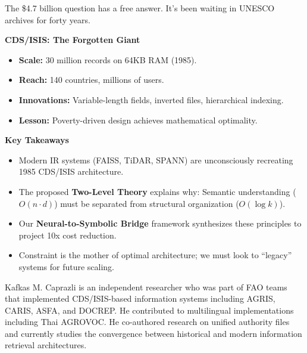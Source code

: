 \documentclass[manuscript,screen,nonacm]{acmart}
\newenvironment{sidebarbox}[1][]{%
  \def\sidebarboxtitle{#1}%
  \begin{oframed}%
  \noindent\textbf{\sidebarboxtitle}\par\smallskip
}{%
  \end{oframed}%
}
\begin{document}
The \$4.7 billion question has a free answer. It's been waiting in UNESCO archives for forty years.

\begin{sidebarbox}[CDS/ISIS: The Forgotten Giant]
\begin{itemize}
    \item \textbf{Scale:} 30 million records on 64KB RAM (1985).
    \item \textbf{Reach:} 140 countries, millions of users.
    \item \textbf{Innovations:} Variable-length fields, inverted files, hierarchical indexing.
    \item \textbf{Lesson:} Poverty-driven design achieves mathematical optimality.
\end{itemize}
\end{sidebarbox}

\begin{sidebarbox}[Key Takeaways]
\begin{itemize}
    \item Modern IR systems (FAISS, TiDAR, SPANN) are unconsciously recreating 1985 CDS/ISIS architecture.
    \item The proposed \textbf{Two-Level Theory} explains why: Semantic understanding ($O(n \cdot d)$) must be separated from structural organization ($O(\log k)$).
    \item Our \textbf{Neural-to-Symbolic Bridge} framework synthesizes these principles to project 10x cost reduction.
    \item Constraint is the mother of optimal architecture; we must look to ``legacy'' systems for future scaling.
\end{itemize}
\end{sidebarbox}




\begin{acks}
Kafkas M. Caprazli is an independent researcher who was part of FAO teams that implemented CDS/ISIS-based information systems including AGRIS, CARIS, ASFA, and DOCREP. He contributed to multilingual implementations including Thai AGROVOC. He co-authored research on unified authority files \cite{caprazli2003} and currently studies the convergence between historical and modern information retrieval architectures.
\end{acks}
\end{document}
